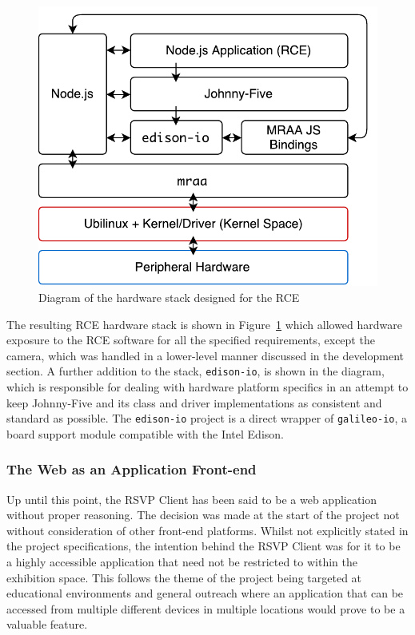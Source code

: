       \begin{figure}[h!]
        \centering
        \includegraphics[width=0.5\linewidth]{figures/softDesign-rceHardwarePlatformStack}
        \caption[Diagram of the hardware stack designed for the RCE]{Diagram of the hardware stack designed for the RCE}
        \label{fig:softDesign-rceHardwarePlatformStack}
      \end{figure}
      
      The resulting RCE hardware stack is shown in Figure~\ref{fig:softDesign-rceHardwarePlatformStack} which allowed hardware exposure to the RCE software for all the specified requirements, except the camera, which was handled in a lower-level manner discussed in the development section. A further addition to the stack, \texttt{edison-io}, is shown in the diagram, which is responsible for dealing with hardware platform specifics in an attempt to keep Johnny-Five and its class and driver implementations as consistent and standard as possible. The \texttt{edison-io} project is a direct wrapper of \texttt{galileo-io}, a board support module compatible with the Intel Edison.
      
    \subsubsection{The Web as an Application Front-end}
    \label{subsubsec:applicationFrontend}
      Up until this point, the RSVP Client has been said to be a web application without proper reasoning. The decision was made at the start of the project not without consideration of other front-end platforms. Whilst not explicitly stated in the project specifications, the intention behind the RSVP Client was for it to be a highly accessible application that need not be restricted to within the exhibition space. This follows the theme of the project being targeted at educational environments and general outreach where an application that can be accessed from multiple different devices in multiple locations would prove to be a valuable feature.
      
